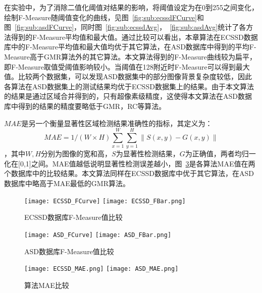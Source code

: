 在实验中，为了消除二值化阈值对结果的影响，将阈值设定为在0到255之间变化，绘制F-Measure随阈值变化的曲线，见图~\ref{fig:sub:ecssdFCurve}和图~\ref{fig:sub:asdFCurve}，同时图~\ref{fig:sub:ecssdAvg}，~\ref{fig:sub:asdAvg}统计了各方法得到的F-Measure平均值和最大值。通过比较可以看出，本章算法在ECSSD数据库中的F-Measure平均值和最大值均优于其它算法，在ASD数据库中得到的平均F-Measure高于GMR算法外的其它算法。本文算法得到的F-Measure曲线较为扁平，即F-Measure取值受阈值影响较小。当阈值在128附近时F-Measure可以得到最大值。比较两个数据集，可以发现ASD数据集中的部分图像背景复杂度较低，因此各算法在ASD数据集上的测试结果均优于ECSSD数据集上的结果。由于本文算法的结果是通过区域合并得到的，只有超像素级精度，这使得本文算法在ASD数据库中得到的结果的精度要略低于GMR，RC等算法。 \par
$MAE$是另一个衡量显著性区域检测结果准确性的指标，其定义为：
$$MAE=1/(W\times H) \sum_{x=1}^W\sum_{y=1}^H \| S(x,y)-G(x,y)\|$$ ，其中$W,H$分别为图像的宽和高，$S$为显著性检测结果，$G$为正确值，两者均归一化在[0,1]之间。MAE值越低说明显著性检测误差越小，图~\ref{fig:MAERst}是各算法MAE值在两个数据库中的比较结果。本文算法同样在ECSSD数据库中优于其它算法，在ASD数据库中略高于MAE最低的GMR算法。\par
\begin{figure}[h]
  \centering%
    {\texttt{[image: ECSSD\_FCurve]}}%
      {\texttt{[image: ECSSD\_FBar.png]}}
  \caption{ECSSD数据库F-Measure值比较}
  \label{fig:ECSSDRst}
\end{figure}

\begin{figure}[h]
  \centering%
    {\texttt{[image: ASD\_FCurve]}}%
      {\texttt{[image: ASD\_FBar.png]}}
  \caption{ASD数据库F-Measure值比较}
  \label{fig:ASDRst}
\end{figure}

\begin{figure}[h]
  \centering%
    {\texttt{[image: ECSSD\_MAE.png]}}%
      {\texttt{[image: ASD\_MAE.png]}}
  \caption{算法MAE比较}
  \label{fig:MAERst}
\end{figure}

